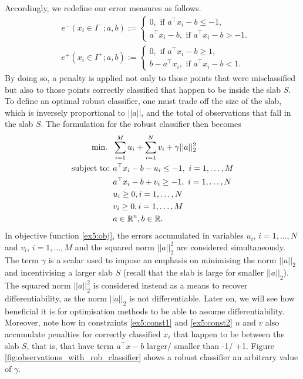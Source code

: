 \documentclass{article}
\begin{document}
Accordingly, we redefine our error measures as follows. 
%
\begin{align*}
& e^-(x_i \in I^-; a, b) := 
    \begin{cases} 0, \text{ if } a^\top x_i - b \leq -1, \\
        a^\top x_i - b, \text{ if } a^\top x_i - b > -1.
    \end{cases} \\
& e^+(x_i \in I^+; a, b) := 
    \begin{cases} 0, \text{ if } a^\top x_i - b \geq 1, \\
        b -  a^\top x_i, \text{ if } a^\top x_i - b < 1.
    \end{cases}                   
\end{align*}
%
By doing so, a penalty is applied not only to those points that were misclassified but also to those points correctly classified that happen to be inside the slab $S$. To define an optimal robust classifier, one must trade off the size of the slab, which is inversely proportional to $||a||$, and the total of observations that fall in the slab $S$. The formulation for the robust classifier then becomes
%
\begin{align}
\mathop{\text{min.} \ } \ & \sum_{i=1}^M u_i + \sum_{i=1}^N v_i + \gamma||a||_2^2 \label{ex5:obj}\\
\mbox{subject to: } & a^\top x_i - b - u_i \leq -1, \ i = 1,\dots,M \label{ex5:const1} \\
    & a^\top x_i - b + v_i \geq -1, \ i = 1,\dots,N \label{ex5:const2} \\
    & u_i \geq 0, i = 1, \dots, N \\
    & v_i \geq 0, i = 1, \dots, M \\
    & a \in \mathbb R^n, b \in \mathbb R.
\end{align} 
%  
In objective function \eqref{ex5:obj}, the errors accumulated in variables $u_i$, $i=1,\dots,N$ and $v_i$, $i = 1,\dots,M$ and the squared norm $||a||_2^2$ are considered simultaneously. The term $\gamma$ is a scalar used to impose an emphasis on minimising the norm $||a||_2$ and incentivising a larger slab $S$ (recall that the slab is large for smaller $||a||_2$). The squared norm  $||a||_2^2$ is considered instead as a means to recover differentiability, as the norm  $||a||_2$ is not differentiable. Later on, we will see how beneficial it is for optimisation methods to be able to assume differentiability. Moreover, note how in constraints \eqref{ex5:const1} and \eqref{ex5:const2} $u$ and $v$ also accumulate penalties for correctly classified $x_i$ that happen to be between the slab $S$, that is, that have term $a^\top x - b$ larger/ smaller than -1/ +1. Figure \ref{fig:observations_with_rob_classifier} shows a robust classifier an arbitrary value of $\gamma$.
\end{document}

